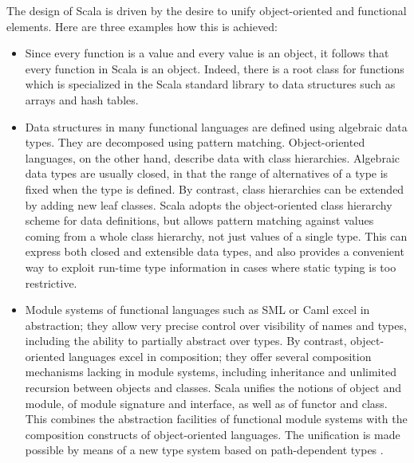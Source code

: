 The design of Scala is driven by the desire to unify object-oriented
and functional elements. Here are three examples how this is achieved:
\begin{itemize}
\item
Since every function is a value and every value is an object, it
follows that every function in Scala is an object. Indeed, there is a
root class for functions which is specialized in the Scala standard
library to data structures such as arrays and hash tables.
\item
Data structures in many functional languages are defined using
algebraic data types. They are decomposed using pattern matching.
Object-oriented languages, on the other hand, describe data with class
hierarchies. Algebraic data types are usually closed, in that the
range of alternatives of a type is fixed when the type is defined.  By
contrast, class hierarchies can be extended by adding new leaf
classes.  Scala adopts the object-oriented class hierarchy scheme for
data definitions, but allows pattern matching against values coming
from a whole class hierarchy, not just values of a single type.
This can express both closed and extensible data types, and also
provides a convenient way to exploit run-time type information in
cases where static typing is too restrictive.
\item
Module systems of functional languages such as SML or Caml excel in
abstraction; they allow very precise control over visibility of names
and types, including the ability to partially abstract over types.  By
contrast, object-oriented languages excel in composition; they offer
several composition mechanisms lacking in module systems, including
inheritance and unlimited recursion between objects and classes.
Scala unifies the notions of object and module, of module signature
and interface, as well as of functor and class. This combines the
abstraction facilities of functional module systems with the
composition constructs of object-oriented languages. The unification
is made possible by means of a new type system based on path-dependent
types \cite{odersky-et-al:fool10}.
\end{itemize}


